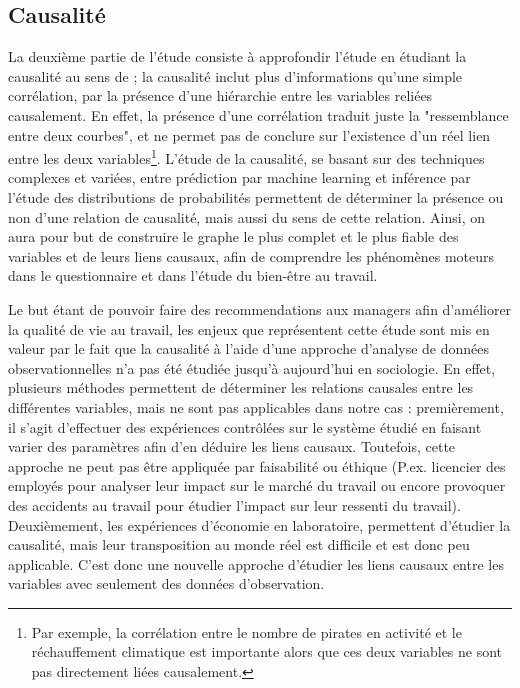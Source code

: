 \documentclass[11pt,fleqn,openany,frenchb]{book} %
\begin{document}
\subsection{Causalité}
La deuxième partie de l'étude consiste à approfondir l'étude en
étudiant la causalité au sens de \cite{granger1969causality} ; la
causalité inclut plus d'informations qu'une simple corrélation, par la
présence d'une hiérarchie entre les variables reliées causalement. En
effet, la présence d'une corrélation traduit juste la "ressemblance
entre deux courbes", et ne permet pas de conclure sur l'existence d'un
réel lien entre les deux variables\footnote{Par exemple, la
  corrélation entre le nombre de pirates en activité et le
  réchauffement climatique est importante alors que ces deux variables
  ne sont pas directement liées causalement.}. L'étude de la
causalité, se basant sur des techniques complexes et variées, entre
prédiction par machine learning et inférence par l'étude des
distributions de probabilités permettent de déterminer la présence ou
non d'une relation de causalité, mais aussi du sens de cette
relation. Ainsi, on aura pour but de construire le graphe le plus
complet et le plus fiable des variables et de leurs liens causaux,
afin de comprendre les phénomènes moteurs dans le questionnaire et
dans l'étude du bien-être au travail.\par
Le but étant de pouvoir faire
des recommendations aux managers afin d'améliorer la qualité de vie au
travail, les enjeux que représentent cette étude sont mis en valeur
par le fait que la causalité à l'aide d'une approche d'analyse de données observationnelles n'a pas été
étudiée jusqu'à aujourd'hui en sociologie. En effet, plusieurs méthodes permettent de déterminer les relations causales entre les différentes variables, mais ne sont pas applicables dans notre cas : premièrement, il s'agit d'effectuer des expériences contrôlées sur le système étudié en faisant varier des paramètres afin d'en déduire les liens causaux. Toutefois, cette approche ne peut pas être appliquée par faisabilité ou éthique (P.ex. licencier des employés pour analyser leur impact sur le marché du travail ou encore provoquer des accidents au travail pour étudier l'impact sur leur ressenti du travail). Deuxièmement, les expériences d'économie en laboratoire, permettent d'étudier la causalité, mais leur transposition au monde réel est difficile et est donc peu applicable. C'est donc une nouvelle approche d'étudier les liens causaux entre les variables avec seulement des données d'observation. \par %
\end{document}
